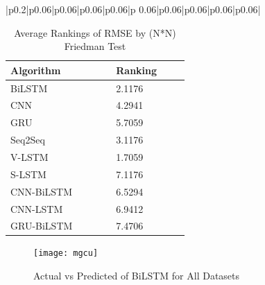 \begin{landscape}
{\begin{longtable}{|p{0.2\linewidth}|p{0.06\linewidth}|p{0.06\linewidth}|p{0.06\linewidth}|p{0.06\linewidth}|p
        {0.06\linewidth}|p{0.06\linewidth}|p{0.06\linewidth}|p{0.06\linewidth}|p{0.06\linewidth}|}
\end{longtable}}
\end{landscape}


\begin{table}[!htp]
\centering
\setlength{\tabcolsep}{3pt}
{\renewcommand{\arraystretch}{1}%
    \caption{Average Rankings of RMSE by (N*N) Friedman Test}
\label{tab:RMSE_Rnk}
\begin{tabular}{|p{0.2\linewidth}|p{0.1\linewidth}|}
\hline
Algorithm&Ranking\\\hline
BiLSTM & 2.1176\\ \hline
CNN & 4.2941\\\hline
GRU & 5.7059\\\hline
Seq2Seq & 3.1176\\\hline
V-LSTM & 1.7059\\\hline
S-LSTM & 7.1176\\\hline
CNN-BiLSTM & 6.5294\\\hline
CNN-LSTM & 6.9412\\\hline
GRU-BiLSTM & 7.4706\\\hline
\end{tabular}}

\end{table}

\pagebreak
\begin{figure}[H]
    \centering
    \texttt{[image: mgcu]}
    \caption{Actual vs Predicted of BiLSTM for All Datasets}
    \label{img:bilstn_a_p}
\end{figure}
